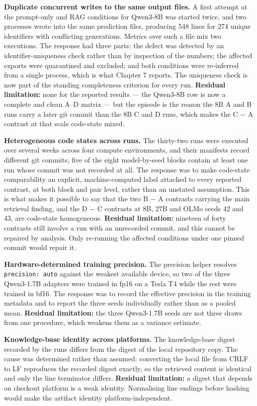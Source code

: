 \textbf{Duplicate concurrent writes to the same output files.} A first attempt at the prompt-only and RAG conditions for Qwen3-8B was started twice, and two processes wrote into the same prediction files, producing 548 lines for 274 unique identifiers with conflicting generations. Metrics over such a file mix two executions. The response had three parts: the defect was detected by an identifier-uniqueness check rather than by inspection of the numbers; the affected exports were quarantined and excluded; and both conditions were re-inferred from a single process, which is what Chapter 7 reports. The uniqueness check is now part of the standing completeness criterion for every run. \textbf{Residual limitation:} none for the reported results --- the Qwen3-8B row is now a complete and clean A--D matrix --- but the episode is the reason the 8B A and B runs carry a later git commit than the 8B C and D runs, which makes the C \ensuremath{-} A contrast at that scale code-state mixed.

\textbf{Heterogeneous code states across runs.} The thirty-two runs were executed over several weeks across four compute environments, and their manifests record different git commits; five of the eight model-by-seed blocks contain at least one run whose commit was not recorded at all. The response was to make code-state comparability an explicit, machine-computed label attached to every reported contrast, at both block and pair level, rather than an unstated assumption. This is what makes it possible to say that the two B \ensuremath{-} A contrasts carrying the main retrieval finding, and the D \ensuremath{-} C contrasts at 8B, 27B and OLMo seeds 42 and 43, are code-state homogeneous. \textbf{Residual limitation:} nineteen of forty contrasts still involve a run with an unrecorded commit, and this cannot be repaired by analysis. Only re-running the affected conditions under one pinned commit would repair it.

\textbf{Hardware-determined training precision.} The precision helper resolves \texttt{precision:\ auto} against the weakest available device, so two of the three Qwen3-1.7B adapters were trained in fp16 on a Tesla T4 while the rest were trained in bf16. The response was to record the effective precision in the training metadata and to report the three seeds individually rather than as a pooled mean. \textbf{Residual limitation:} the three Qwen3-1.7B seeds are not three draws from one procedure, which weakens them as a variance estimate.

\textbf{Knowledge-base identity across platforms.} The knowledge-base digest recorded by the runs differs from the digest of the local repository copy. The cause was determined rather than assumed: converting the local file from CRLF to LF reproduces the recorded digest exactly, so the retrieved content is identical and only the line terminator differs. \textbf{Residual limitation:} a digest that depends on checkout platform is a weak identity. Normalising line endings before hashing would make the artifact identity platform-independent.

